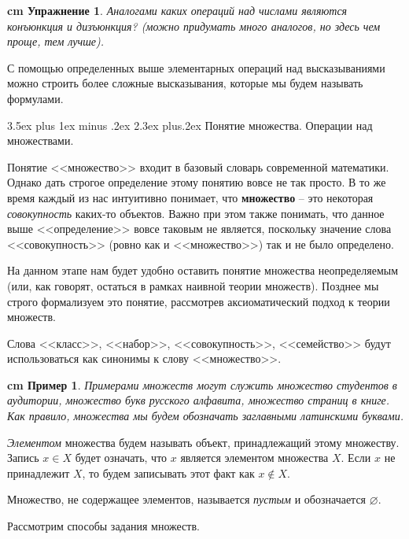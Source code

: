 \documentclass[12pt, russian]{article}
\makeatletter
\renewcommand\subsection{\@startsection {subsection}{2}{\parindent}%
{3.5ex plus 1ex minus .2ex}%
{2.3ex plus.2ex}%
{\normalfont\large\bfseries}}
\newtheorem{example}{\hskip 0.5 cm Пример}%
\newtheorem{exercise}{\hskip 0.5 cm Упражнение}%
\makeatother
\begin{document}
\begin{exercise}
	Аналогами каких операций над числами являются конъюнкция и дизъюнкция? (можно придумать много аналогов, но здесь чем проще, тем лучше).
\end{exercise}

С помощью определенных выше элементарных операций над высказываниями можно строить более сложные высказывания, которые мы будем называть формулами.


\subsection{Понятие множества. Операции над множествами.}

Понятие <<множество>> входит в базовый словарь современной математики. Однако дать строгое определение этому понятию вовсе не так просто. В то же время каждый из нас интуитивно понимает, что \textbf{множество} -- это некоторая \textit{совокупность} каких-то объектов. Важно при этом также понимать, что данное выше <<определение>> вовсе таковым не является, поскольку значение слова <<совокупность>> (ровно как и <<множество>>) так и не было определено.

На данном этапе нам будет удобно оставить понятие множества неопределяемым (или, как говорят, остаться в рамках наивной теории множеств). Позднее мы строго формализуем это понятие, рассмотрев аксиоматический подход к теории множеств.

Слова <<класс>>, <<набор>>, <<совокупность>>, <<семейство>> будут использоваться как синонимы к слову <<множество>>.

\begin{example}
	Примерами множеств могут служить множество студентов в аудитории,  множество букв русского алфавита, множество страниц в книге. Как правило, множества мы будем обозначать заглавными латинскими буквами.
\end{example}

\textit{Элементом} множества будем называть объект, принадлежащий этому множеству. Запись $x \in X$ будет означать, что $x$ является элементом множества $X$. Если $x$ не принадлежит $X$, то будем записывать этот факт как $x \notin X$.

Множество, не содержащее элементов, называется \textit{пустым} и обозначается $\varnothing$.

Рассмотрим способы задания множеств.
\end{document}
